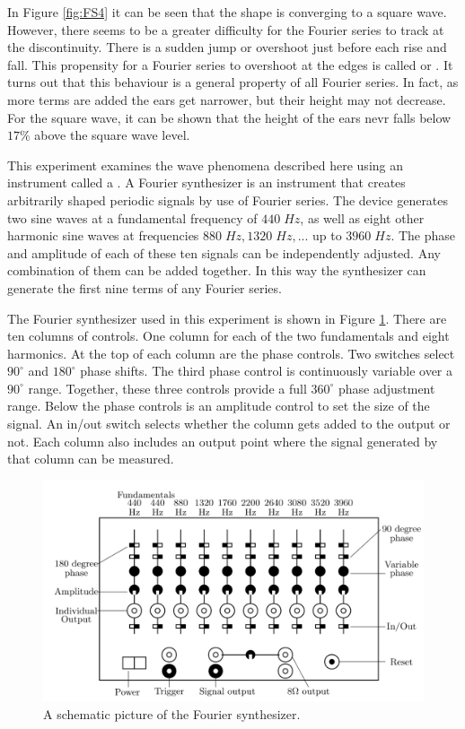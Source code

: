 \documentclass[12pt, a4paper, oneside, openright, titlepage]{book}
\begin{document}
\noindent In Figure \ref{fig:FS4} it can be seen that the shape is converging to a square wave. However, there seems to be a greater difficulty for the Fourier series to track at the discontinuity. There is a sudden jump or overshoot just before each rise and fall. This propensity for a Fourier series to overshoot at the edges is called  or . It turns out that this behaviour is a general property of all Fourier series. In fact, as more terms are added the ears get narrower, but their height may not decrease. For the square wave, it can be shown that the height of the ears nevr falls below $17\%$ above the square wave level.

\noindent This experiment examines the wave phenomena described here using an instrument called a . A Fourier synthesizer is an instrument that creates arbitrarily shaped periodic signals by use of Fourier series. The device generates two sine waves at a fundamental frequency of $440\;Hz$, as well as eight other harmonic sine waves at frequencies $880\;Hz, 1320\;Hz,...$ up to $3960\;Hz$. The phase and amplitude of each of these ten signals can be independently adjusted. Any combination of them can be added together. In this way the synthesizer can generate the first nine terms of any Fourier series.

\noindent The Fourier synthesizer used in this experiment is shown in Figure \ref{fig:FS5}. There are ten columns of controls. One column for each of the two fundamentals and eight harmonics. At the top of each column are the phase controls. Two switches select $90^{\circ}$ and $180^{\circ}$ phase shifts. The third phase control is continuously variable over a $90^{\circ}$ range. Together, these three controls provide a full $360^{\circ}$ phase adjustment range. Below the phase controls is an amplitude control to set the size of the signal. An in/out switch selects whether the column gets added to the output or not. Each column also includes an output point where the signal generated by that column can be measured.

\begin{figure}[H]
    \centering
    \includegraphics[scale = 0.8]{Images/FS5.PNG}
    \caption{A schematic picture of the Fourier synthesizer.}
    \label{fig:FS5}
\end{figure}
\end{document}
